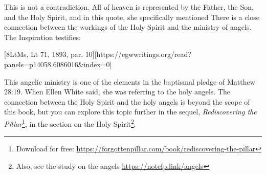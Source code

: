 This is not a contradiction. All of heaven is represented by the Father, the Son, and the Holy Spirit, and in this quote, she specifically mentioned  There is a close connection between the workings of the Holy Spirit and the ministry of angels. The Inspiration testifies:

[8LtMs, Lt 71, 1893, par. 10][https://egwwritings.org/read?panels=p14058.6086016&index=0]

This angelic ministry is one of the elements in the baptismal pledge of Matthew 28:19. When Ellen White said,  she was referring to the holy angels. The connection between the Holy Spirit and the holy angels is beyond the scope of this book, but you can explore this topic further in the sequel, \textit{Rediscovering the Pillar}\footnote{Download for free: \href{https://forgottenpillar.com/book/rediscovering-the-pillar}{https://forgottenpillar.com/book/rediscovering-the-pillar}}, in the section on the Holy Spirit\footnote{Also, see the study on the angels \href{https://notefp.link/angels}{https://notefp.link/angels}}.


